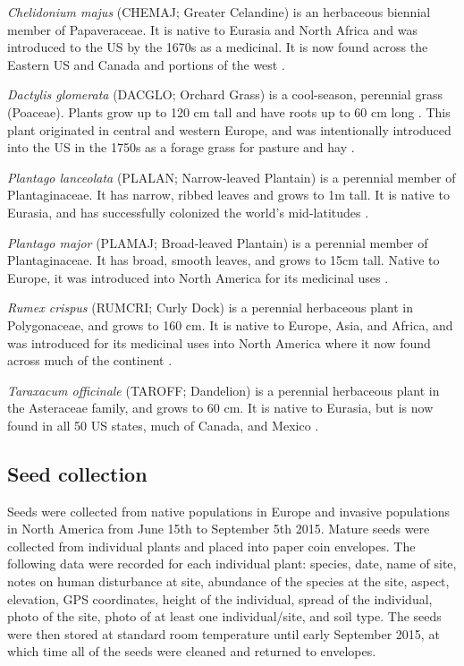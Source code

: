 \documentclass[12pt]{article}\usepackage[]{graphicx}\usepackage[]{color}
\begin{document}
	\textit{Chelidonium majus} (CHEMAJ; Greater Celandine) is an herbaceous biennial member of Papaveraceae. It is native to Eurasia and North Africa and was introduced to the US by the 1670s as a medicinal. It is now found across the Eastern US and Canada and portions of the west \parencite{Holm1979}. 
	
	\textit{Dactylis glomerata} (DACGLO; Orchard Grass) is a cool-season, perennial grass (Poaceae). Plants grow up to 120 cm tall and have roots up to 60 cm long \parencite{Moser1996}. This plant originated in central and western Europe, and was intentionally introduced into the US in the 1750s \parencite{Bush2012} as a forage grass for pasture and hay \parencite{Ogle2011}.  
	
	\textit{Plantago lanceolata} (PLALAN; Narrow-leaved Plantain) is a perennial member of  Plantaginaceae. It has narrow, ribbed leaves and grows to 1m tall. It is native to Eurasia, and has successfully colonized the world's mid-latitudes \parencite{Holm1977}.
	
	\textit{Plantago major} (PLAMAJ; Broad-leaved Plantain) is a perennial member of Plantaginaceae. It has broad, smooth leaves, and grows to 15cm tall. Native to Europe, it was introduced into North America for its medicinal uses \parencite{Knobloch1996,Samuelsen2000}.
	
	\textit{Rumex crispus} (RUMCRI; Curly Dock) is a perennial herbaceous plant in Polygonaceae, and grows to 160 cm. It is native to Europe, Asia, and Africa, and was introduced for its medicinal uses into North America where it now found across much of the continent \parencite{USDA2010}. 
	
	\textit{Taraxacum officinale} (TAROFF; Dandelion) is a perennial herbaceous plant in the Asteraceae family, and grows to 60 cm. It is native to Eurasia, but is now found in all 50 US states, much of Canada, and Mexico \parencite{USDA1971}.
	
	\subsection{Seed collection}
	Seeds were collected from native populations in Europe and invasive populations in North America from June 15th to September 5th 2015. Mature seeds were collected from individual plants and placed into paper coin envelopes. The following data were recorded for each individual plant: species, date, name of site, notes on human disturbance at site, abundance of the species at the site, aspect, elevation, GPS coordinates, height of the individual, spread of the individual, photo of the site, photo of at least one individual/site, and soil type. The seeds were then stored at standard room temperature until early September 2015, at which time all of the seeds were cleaned and returned to envelopes. 
\end{document}
